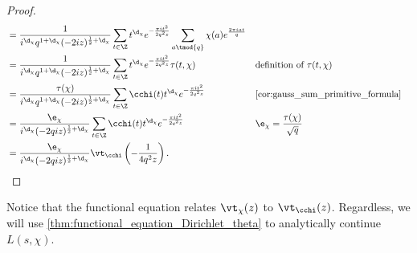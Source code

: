 \begin{proof}
\begin{align*}
          &= \frac{1}{i^{\d_{\chi}}q^{1+\d_{\chi}}(-2iz)^{\frac{1}{2}+\d_{\chi}}}\sum_{t \in \Z}t^{\d_{\chi}}e^{-\frac{\pi it^{2}}{2q^{2}z}}\sum_{a \tmod{q}}\chi(a)e^{\frac{2\pi i at}{q}} \\
          &= \frac{1}{i^{\d_{\chi}}q^{1+\d_{\chi}}(-2iz)^{\frac{1}{2}+\d_{\chi}}}\sum_{t \in \Z}t^{\d_{\chi}}e^{-\frac{\pi it^{2}}{2q^{2}z}}\tau(t,\chi) && \text{definition of $\tau(t,\chi)$} \\
          &= \frac{\tau(\chi)}{i^{\d_{\chi}}q^{1+\d_{\chi}}(-2iz)^{\frac{1}{2}+\d_{\chi}}}\sum_{t \in \Z}\cchi(t)t^{\d_{\chi}}e^{-\frac{\pi it^{2}}{2q^{2}z}} && \text{\cref{cor:gauss_sum_primitive_formula}} \\
          &= \frac{\e_{\chi}}{i^{\d_{\chi}}(-2qiz)^{\frac{1}{2}+\d_{\chi}}}\sum_{t \in \Z}\cchi(t)t^{\d_{\chi}}e^{-\frac{\pi it^{2}}{2q^{2}z}} && \text{$\e_{\chi} = \frac{\tau(\chi)}{\sqrt{q}}$} \\
          &=  \frac{\e_{\chi}}{i^{\d_{\chi}}(-2qiz)^{\frac{1}{2}+\d_{\chi}}}\vt_{\cchi}\left(-\frac{1}{4q^{2}z}\right).
        \end{align*}
      \end{proof}

      Notice that the functional equation relates $\vt_{\chi}(z)$ to $\vt_{\cchi}(z)$. Regardless, we will use \cref{thm:functional_equation_Dirichlet_theta} to analytically continue $L(s,\chi)$.
